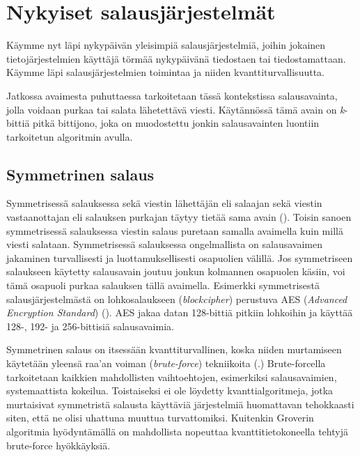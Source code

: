 \chapter{Nykyiset salausjärjestelmät\label{methods}}

Käymme nyt läpi nykypäivän yleisimpiä salausjärjestelmiä, joihin jokainen tietojärjestelmien käyttäjä törmää nykypäivänä tiedostaen tai tiedostamattaan. Käymme läpi salausjärjestelmien toimintaa ja niiden kvanttiturvallisuutta.

Jatkossa avaimesta puhuttaessa tarkoitetaan tässä kontekstissa salausavainta, jolla voidaan purkaa tai salata lähetettävä viesti. Käytännössä tämä avain on \emph{k}-bittiä pitkä bittijono, joka on muodostettu jonkin salausavainten luontiin tarkoitetun algoritmin avulla.

\section{Symmetrinen salaus}
 Symmetrisessä salauksessa sekä viestin lähettäjän eli salaajan sekä viestin vastaanottajan eli salauksen purkajan täytyy tietää sama avain (\cite{bellare2005introduction}). Toisin sanoen symmetrisessä salauksessa viestin salaus puretaan samalla avaimella kuin millä viesti salataan.  Symmetrisessä salauksessa ongelmallista on salausavaimen jakaminen turvallisesti ja luottamuksellisesti osapuolien välillä. Jos symmetriseen salaukseen käytetty salausavain joutuu jonkun kolmannen osapuolen käsiin, voi tämä osapuoli purkaa salauksen tällä avaimella. Esimerkki symmetrisestä salausjärjestelmästä on lohkosalaukseen (\emph{blockcipher}) perustuva AES (\emph{Advanced Encryption Standard}) (\cite{117146}). AES jakaa datan 128-bittiä pitkiin lohkoihin ja käyttää 128-, 192- ja 256-bittisiä salausavaimia.
 
 Symmetrinen salaus on itsessään kvanttiturvallinen, koska niiden murtamiseen käytetään yleensä raa'an voiman (\emph{brute-force}) tekniikoita (\cite{mavroeidis2018impact}.) Brute-forcella tarkoitetaan kaikkien mahdollisten vaihtoehtojen, esimerkiksi salausavaimien, systemaattista kokeilua. %
Toistaiseksi ei ole löydetty kvanttialgoritmeja, jotka murtaisivat symmetristä salausta käyttäviä järjestelmiä huomattavan tehokkaasti siten, että ne olisi uhattuna muuttua turvattomiksi. Kuitenkin Groverin algoritmia hyödyntämällä on mahdollista nopeuttaa kvanttitietokoneella tehtyjä brute-force hyökkäyksiä.
 
